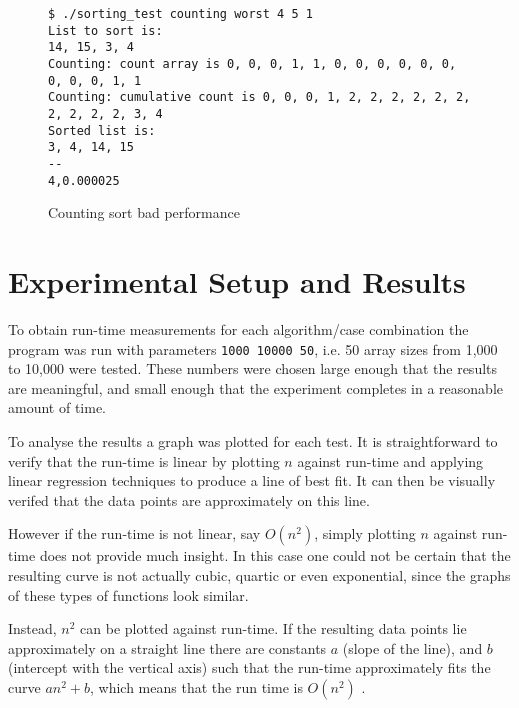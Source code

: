 \documentclass{article}
\begin{document}
\begin{figure}[H]
	\centering
	\begin{BVerbatim}
$ ./sorting_test counting worst 4 5 1
List to sort is:
14, 15, 3, 4
Counting: count array is 0, 0, 0, 1, 1, 0, 0, 0, 0, 0, 0, 0, 0, 0, 1, 1
Counting: cumulative count is 0, 0, 0, 1, 2, 2, 2, 2, 2, 2, 2, 2, 2, 2, 3, 4
Sorted list is:
3, 4, 14, 15
--
4,0.000025
	\end{BVerbatim}
	\caption{Counting sort bad performance}
	\label{counting-bad-test}
\end{figure}

\section{Experimental Setup and Results}

To obtain run-time measurements for each algorithm/case combination the program was run{\footnotemark} with parameters \texttt{1000 10000 50}, i.e. 50 array sizes from 1,000 to 10,000 were tested. These numbers were chosen large enough that the results are meaningful, and small enough that the experiment completes in a reasonable amount of time.


To analyse the results a graph was plotted for each test. It is straightforward to verify that the run-time is linear by plotting $n$ against run-time and applying linear regression techniques to produce a line of best fit. It can then be visually verifed that the data points are approximately on this line.

However if the run-time is not linear, say $O(n^2)$, simply plotting $n$ against run-time does not provide much insight. In this case one could not be certain that the resulting curve is not actually cubic, quartic  or even exponential, since the graphs of these types of functions look similar.

Instead, $n^2$ can be plotted against run-time. If the resulting data points lie approximately on a straight line there are constants $a$ (slope of the line), and $b$ (intercept with the vertical axis) such that the run-time approximately fits the curve $an^2 + b$, which means that the run time is $O(n^2)$ \footnotemark.

\end{document}
